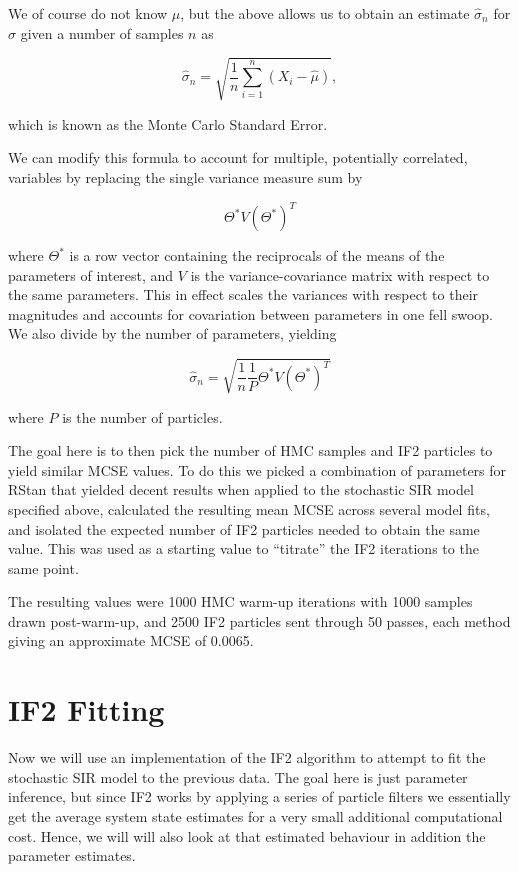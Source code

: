 	We of course do not know $\mu$, but the above allows us to obtain an estimate $\hat{\sigma}_n$ for $\sigma$ given a number of samples $n$ as

	\begin{equation}
		\hat{\sigma}_n = \sqrt{\frac{1}{n} \sum_{i=1}^{n} (X_i - \hat{\mu}) },
	\end{equation}

	which is known as the Monte Carlo Standard Error.

	We can modify this formula to account for multiple, potentially correlated, variables by replacing the single variance measure sum by

	\begin{equation}
		\Theta^* V (\Theta^*)^T
	\end{equation}

	where $\Theta^*$ is a row vector containing the reciprocals of the means of the parameters of interest, and $V$ is the variance-covariance matrix with respect to the same parameters. This in effect scales the variances with respect to their magnitudes and accounts for covariation between parameters in one fell swoop. We also divide by the number of parameters, yielding

	\begin{equation}
		\hat{\sigma}_n = \sqrt{\frac{1}{n} \frac{1}{P} \Theta^* V (\Theta^*)^T }
	\end{equation}

	where $P$ is the number of particles.

	The goal here is to then pick the number of HMC samples and IF2 particles to yield similar MCSE values. To do this we picked a combination of parameters for RStan that yielded decent results when applied to the stochastic SIR model specified above, calculated the resulting mean MCSE across several model fits, and isolated the expected number of IF2 particles needed to obtain the same value. This was used as a starting value to ``titrate'' the IF2 iterations to the same point.

	The resulting values were 1000 HMC warm-up iterations with 1000 samples drawn post-warm-up, and 2500 IF2 particles sent through 50 passes, each method giving an approximate MCSE of 0.0065.


\section{IF2 Fitting}

	Now we will use an implementation of the IF2 algorithm to attempt to fit the stochastic SIR model to the previous data. The goal here is just parameter inference, but since IF2 works by applying a series of particle filters we essentially get the average system state estimates for a very small additional computational cost. Hence, we will will also look at that estimated behaviour in addition the parameter estimates.

